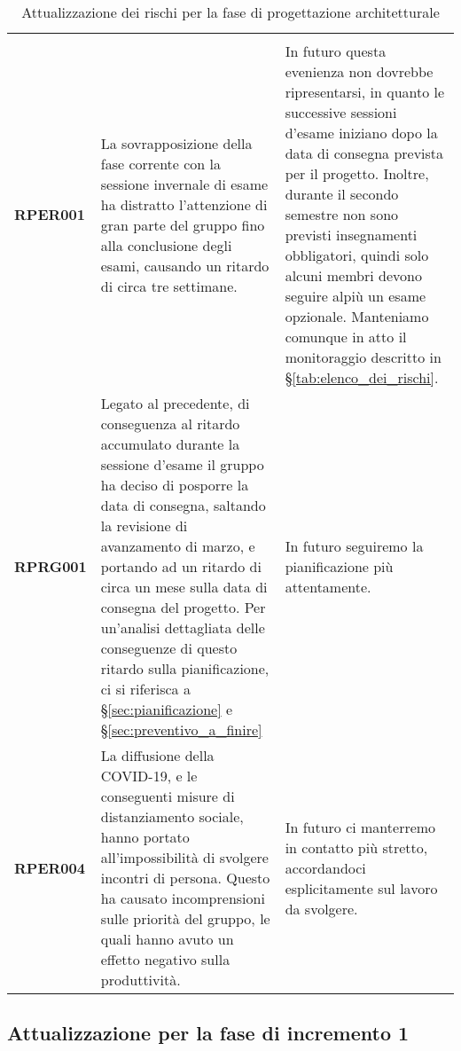 \documentclass[../piano-di-progetto]{subfiles}
\begin{document}
\begin{longtable}[H]{|p{10em}|p{17em}|p{17em}|}
  \caption{Attualizzazione dei rischi per la fase di progettazione architetturale}%
  \label{tab:attualizzazione_per_la_fase_di_progettazione_architetturale} \\
  \rowcolor{darkgray!90!}
  \color{white}{\textbf{Rischio}} & \color{white}{\textbf{Gestione}} & \color{white}{\textbf{Monitoraggio}} \\
  \textbf{RPER001} & La sovrapposizione della fase corrente con la sessione invernale di esame ha distratto l'attenzione di gran parte del gruppo fino alla conclusione degli esami, causando un ritardo di circa tre settimane. & In futuro questa evenienza non dovrebbe ripresentarsi, in quanto le successive sessioni d'esame iniziano dopo la data di consegna prevista per il progetto. Inoltre, durante il secondo semestre non sono previsti insegnamenti obbligatori, quindi solo alcuni membri devono seguire alpiù un esame opzionale. Manteniamo comunque in atto il monitoraggio descritto in §\ref{tab:elenco_dei_rischi}. \\
  \textbf{RPRG001} & Legato al precedente, di conseguenza al ritardo accumulato durante la sessione d'esame il gruppo ha deciso di posporre la data di consegna, saltando la revisione di avanzamento di marzo, e portando ad un ritardo di circa un mese sulla data di consegna del progetto. Per un'analisi dettagliata delle conseguenze di questo ritardo sulla pianificazione, ci si riferisca a §\ref{sec:pianificazione} e §\ref{sec:preventivo_a_finire} & In futuro seguiremo la pianificazione più attentamente. \\
  \textbf{RPER004} & La diffusione della COVID-19, e le conseguenti misure di distanziamento sociale, hanno portato all'impossibilità di svolgere incontri di persona. Questo ha causato incomprensioni sulle priorità del gruppo, le quali hanno avuto un effetto negativo sulla produttività. & In futuro ci manterremo in contatto più stretto, accordandoci esplicitamente sul lavoro da svolgere. \\
\end{longtable}

\subsection{Attualizzazione per la fase di incremento 1}%
\label{sub:attualizzazione_per_la_fase_di_incremento_1}
\end{document}
